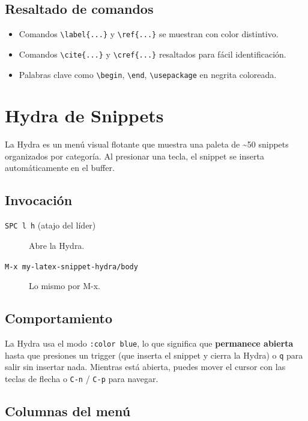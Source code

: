 \documentclass[11pt]{article}
\begin{document}
\subsection{Resaltado de comandos}
\label{sec:org4ae1172}
\begin{itemize}
\item Comandos \texttt{\textbackslash{}label\{...\}} y \texttt{\textbackslash{}ref\{...\}} se muestran con color distintivo.
\item Comandos \texttt{\textbackslash{}cite\{...\}} y \texttt{\textbackslash{}cref\{...\}} resaltados para fácil identificación.
\item Palabras clave como \texttt{\textbackslash{}begin}, \texttt{\textbackslash{}end}, \texttt{\textbackslash{}usepackage} en negrita coloreada.
\end{itemize}
\section{Hydra de Snippets}
\label{sec:orgb00261e}

La Hydra es un menú visual flotante que muestra una paleta de \textasciitilde{}50 snippets organizados por categoría. Al presionar una tecla, el snippet se inserta automáticamente en el buffer.
\subsection{Invocación}
\label{sec:org24a5c9f}

\begin{description}
\item[{\texttt{SPC l h} (atajo del líder)}] Abre la Hydra.
\item[{\texttt{M-x my-latex-snippet-hydra/body}}] Lo mismo por M-x.
\end{description}
\subsection{Comportamiento}
\label{sec:orge914bd3}

La Hydra usa el modo \texttt{:color blue}, lo que significa que \textbf{permanece abierta} hasta que presiones un trigger (que inserta el snippet y cierra la Hydra) o \texttt{q} para salir sin insertar nada. Mientras está abierta, puedes mover el cursor con las teclas de flecha o \texttt{C-n} / \texttt{C-p} para navegar.
\subsection{Columnas del menú}
\label{sec:org9ca0929}
\end{document}
